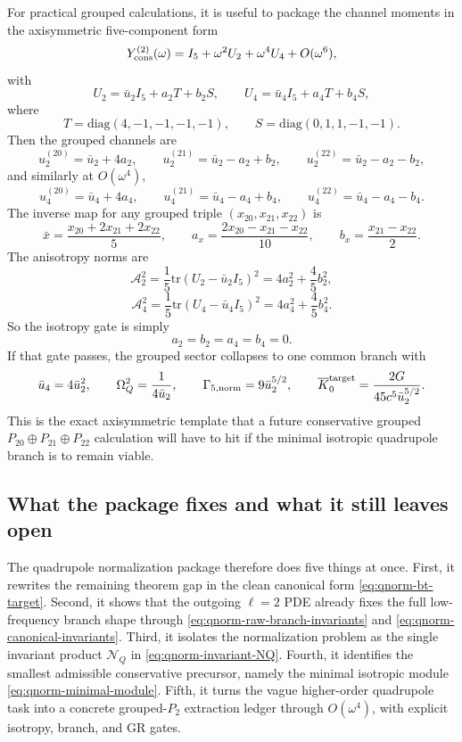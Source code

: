 \documentclass[11pt]{article}
\begin{document}
For practical grouped calculations, it is useful to package the channel moments
in the axisymmetric five-component form
\[
Y_{\rm cons}^{(2)}(\omega)=I_5+\omega^2U_2+\omega^4U_4+O(\omega^6),
\]
with
\[
U_2=\bar u_2 I_5+a_2T+b_2S,
\qquad
U_4=\bar u_4 I_5+a_4T+b_4S,
\]
where
\[
T=\mathrm{diag}(4,-1,-1,-1,-1),
\qquad
S=\mathrm{diag}(0,1,1,-1,-1).
\]
Then the grouped channels are
\[
u_2^{(20)}=\bar u_2+4a_2,
\qquad
u_2^{(21)}=\bar u_2-a_2+b_2,
\qquad
u_2^{(22)}=\bar u_2-a_2-b_2,
\]
and similarly at $O(\omega^4)$,
\[
u_4^{(20)}=\bar u_4+4a_4,
\qquad
u_4^{(21)}=\bar u_4-a_4+b_4,
\qquad
u_4^{(22)}=\bar u_4-a_4-b_4.
\]
The inverse map for any grouped triple $(x_{20},x_{21},x_{22})$ is
\begin{equation}
\boxed{
\bar x=\frac{x_{20}+2x_{21}+2x_{22}}{5},
\qquad
a_x=\frac{2x_{20}-x_{21}-x_{22}}{10},
\qquad
b_x=\frac{x_{21}-x_{22}}{2}.
}
\label{eq:qnorm-grouped-inverse-map}
\end{equation}
The anisotropy norms are
\[
\mathcal A_2^2=\frac15\mathrm{tr}(U_2-\bar u_2I_5)^2
=4a_2^2+\frac45 b_2^2,
\]
\[
\mathcal A_4^2=\frac15\mathrm{tr}(U_4-\bar u_4I_5)^2
=4a_4^2+\frac45 b_4^2.
\]
So the isotropy gate is simply
\begin{equation}
\boxed{a_2=b_2=a_4=b_4=0.}
\label{eq:qnorm-isotropy-gate}
\end{equation}
If that gate passes, the grouped sector collapses to one common branch with
\[
\bar u_4=4\bar u_2^2,
\qquad
\Omega_Q^2=\frac{1}{4\bar u_2},
\qquad
\Gamma_{5,\rm norm}=9\bar u_2^{5/2},
\qquad
\overline K_0^{\rm target}=\frac{2G}{45c^5\bar u_2^{5/2}}.
\]
This is the exact axisymmetric template that a future conservative grouped
$P_{20}\oplus P_{21}\oplus P_{22}$ calculation will have to hit if the
minimal isotropic quadrupole branch is to remain viable.

\subsection{What the package fixes and what it still leaves open}
\label{app:qnorm-package-verdict}

The quadrupole normalization package therefore does five things at once.
First, it rewrites the remaining theorem gap in the clean canonical form
\eqref{eq:qnorm-bt-target}.  Second, it shows that the outgoing $\ell=2$ PDE
already fixes the full low-frequency branch shape through
\eqref{eq:qnorm-raw-branch-invariants} and
\eqref{eq:qnorm-canonical-invariants}.  Third, it isolates the normalization
problem as the single invariant product $\mathcal N_Q$ in
\eqref{eq:qnorm-invariant-NQ}.  Fourth, it identifies the smallest admissible
conservative precursor, namely the minimal isotropic module
\eqref{eq:qnorm-minimal-module}.  Fifth, it turns the vague higher-order
quadrupole task into a concrete grouped-$P_2$ extraction ledger through
$O(\omega^4)$, with explicit isotropy, branch, and GR gates.
\end{document}
